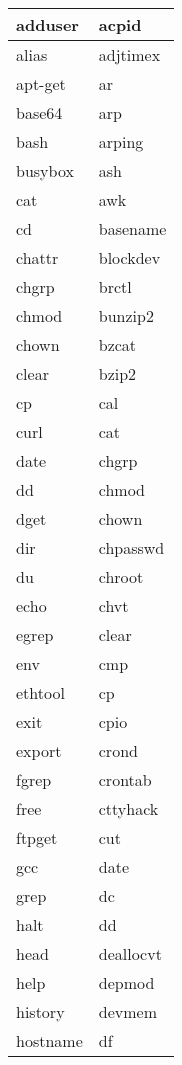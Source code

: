 \begin{longtable}{p{64mm}p{64mm}}
     adduser & acpid  \\
     \hline
     alias & adjtimex  \\
     \hline
     apt-get & ar  \\
     \hline
     base64 & arp  \\
     \hline
     bash & arping  \\
     \hline
     busybox & ash  \\
     \hline
     cat & awk  \\
     \hline
     cd & basename  \\
     \hline
     chattr & blockdev  \\
     \hline
     chgrp & brctl  \\
     \hline
     chmod & bunzip2  \\
     \hline
     chown & bzcat  \\
     \hline
     clear & bzip2  \\
     \hline
     cp & cal  \\
     \hline
     curl & cat  \\
     \hline
     date & chgrp  \\
     \hline
     dd & chmod  \\
     \hline
     dget & chown  \\
     \hline
     dir & chpasswd \\
     \hline
     du & chroot \\
     \hline
     echo & chvt \\
     \hline
     egrep & clear \\
     \hline
     env & cmp \\
     \hline
     ethtool & cp \\
     \hline
     exit & cpio \\
     \hline
     export & crond \\
     \hline
     fgrep & crontab \\
     \hline
     free & cttyhack \\
     \hline
     ftpget & cut \\
     \hline
     gcc & date \\
     \hline
     grep & dc \\
     \hline
     halt & dd \\
     \hline
     head & deallocvt \\
     \hline
     help & depmod \\
     \hline
     history & devmem \\
     \hline
     hostname & df \\

\end{longtable}
